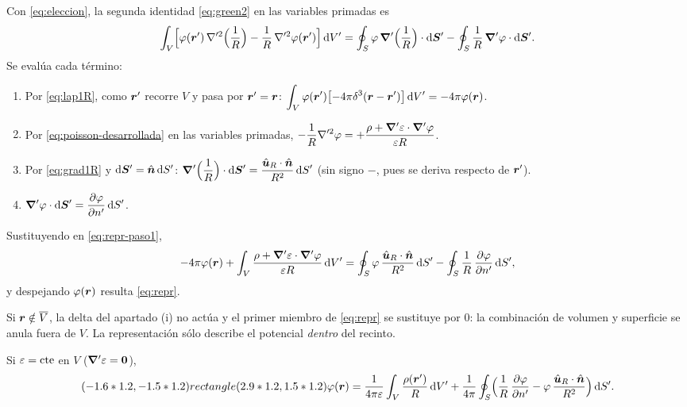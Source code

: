 \documentclass[11pt,a4paper,twoside]{article}
\begin{document}
\begin{demostracion}
Con \eqref{eq:eleccion}, la segunda identidad \eqref{eq:green2} en las variables primadas es
\begin{equation}\label{eq:repr-paso1}
  \int_{V}\Bigl[\varphi(\bm{r}')\,\nabla'^{2}\Bigl(\frac1R\Bigr)-\frac1R\,\nabla'^{2}\varphi(\bm{r}')\Bigr]\,\mathrm{d} V'
  =\oint_{S}\varphi\,\bm{\nabla}'\Bigl(\frac1R\Bigr)\cdot\mathrm{d}\bm{S}'-\oint_{S}\frac1R\,\bm{\nabla}'\varphi\cdot\mathrm{d}\bm{S}' .
\end{equation}
Se evalúa cada término:
\begin{enumerate}
  \item Por \eqref{eq:lap1R}, como $\bm{r}'$ recorre $V$ y pasa por $\bm{r}'=\bm{r}$:
  $\displaystyle\int_V\varphi(\bm{r}')\bigl[-4\pi\delta^{3}(\bm{r}-\bm{r}')\bigr]\,\mathrm{d} V'=-4\pi\varphi(\bm{r})$.
  \item Por \eqref{eq:poisson-desarrollada} en las variables primadas,
  $\displaystyle-\frac1R\nabla'^{2}\varphi=+\frac{\rho+\bm{\nabla}'\varepsilon\cdot\bm{\nabla}'\varphi}{\varepsilon R}$.
  \item Por \eqref{eq:grad1R} y $\mathrm{d}\bm S'=\hat{\bm{n}}\,\mathrm{d} S'$:
  $\displaystyle\bm{\nabla}'\Bigl(\frac1R\Bigr)\cdot\mathrm{d}\bm{S}'=\frac{\hat{\bm{u}}_{R}\cdot\hat{\bm{n}}}{R^{2}}\,\mathrm{d} S'$
  (sin signo $-$, pues se deriva respecto de $\bm{r}'$).
  \item $\displaystyle\bm{\nabla}'\varphi\cdot\mathrm{d}\bm{S}'=\frac{\partial \varphi}{\partial n'}\,\mathrm{d} S'$.
\end{enumerate}
Sustituyendo en \eqref{eq:repr-paso1},
\[
  -4\pi\varphi(\bm{r})+\int_V\frac{\rho+\bm{\nabla}'\varepsilon\cdot\bm{\nabla}'\varphi}{\varepsilon R}\,\mathrm{d} V'
  =\oint_S\varphi\,\frac{\hat{\bm{u}}_{R}\cdot\hat{\bm{n}}}{R^{2}}\,\mathrm{d} S'-\oint_S\frac1R\,\frac{\partial \varphi}{\partial n'}\,\mathrm{d} S' ,
\]
y despejando $\varphi(\bm{r})$ resulta \eqref{eq:repr}.
\end{demostracion}

\begin{observacion}
Si $\bm{r}\notin\overline V$, la delta del apartado (i) no actúa y el primer miembro de
\eqref{eq:repr} se sustituye por $0$: la combinación de volumen y superficie se anula fuera
de $V$. La representación sólo describe el potencial \emph{dentro} del recinto.
\end{observacion}

\begin{corolario}\label{cor:repr-homog}
Si $\varepsilon=\mathrm{cte}$ en $V$ ($\bm{\nabla}'\varepsilon=\bm0$),
\begin{equation}\label{eq:repr-homog}
  (-1.6*1.2,-1.5*1.2) rectangle (2.9*1.2,1.5*1.2){\varphi(\bm{r})=\frac{1}{4\pi\varepsilon}\int_{V}\frac{\rho(\bm{r}')}{R}\,\mathrm{d} V'
  +\frac{1}{4\pi}\oint_{S}\Bigl(\frac1R\,\frac{\partial \varphi}{\partial n'}-\varphi\,\frac{\hat{\bm{u}}_{R}\cdot\hat{\bm{n}}}{R^{2}}\Bigr)\,\mathrm{d} S' .}
\end{equation}
\end{corolario}
\end{document}
